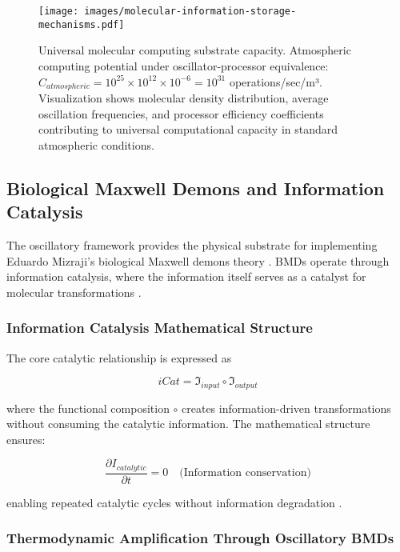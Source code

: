 \documentclass[12pt,a4paper]{article}
\begin{document}
\begin{figure}[H]
    \centering
    \texttt{[image: images/molecular-information-storage-mechanisms.pdf]}
    \caption{Universal molecular computing substrate capacity. Atmospheric computing potential under oscillator-processor equivalence: $C_{atmospheric} = 10^{25} \times 10^{12} \times 10^{-6} = 10^{31}$ operations/sec/m³. Visualization shows molecular density distribution, average oscillation frequencies, and processor efficiency coefficients contributing to universal computational capacity in standard atmospheric conditions.}
    \label{fig:universal_computing}
    \end{figure}

\subsection{Biological Maxwell Demons and Information Catalysis}

The oscillatory framework provides the physical substrate for implementing Eduardo Mizraji's biological Maxwell demons theory \cite{mizraji2007biological}. BMDs operate through information catalysis, where the information itself serves as a catalyst for molecular transformations \cite{mizraji2007biological}.

\subsubsection{Information Catalysis Mathematical Structure}

The core catalytic relationship is expressed as

\begin{equation}
iCat = \mathfrak{I}_{input} \circ \mathfrak{I}_{output}
\end{equation}

where the functional composition $\circ$ creates information-driven transformations without consuming the catalytic information. The mathematical structure ensures:

\begin{equation}
\frac{\partial I_{catalytic}}{\partial t} = 0 \quad \text{(Information conservation)}
\end{equation}

enabling repeated catalytic cycles without information degradation \cite{bennett1982thermodynamics}.


\subsubsection{Thermodynamic Amplification Through Oscillatory BMDs}
\end{document}
